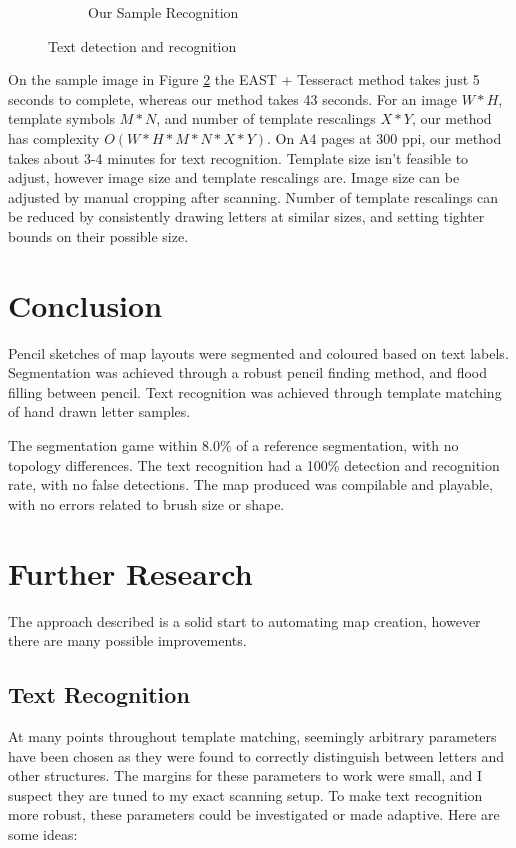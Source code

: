 \documentclass[11pt]{IEEEtran}
\begin{document}
\begin{figure}[h]
\begin{subfigure}[b]{0.4\textwidth}
         \caption{Our Sample Recognition}
         \label{fig:textrec}
     \end{subfigure}
        \caption{Text detection and recognition}
        \label{fig:texttest}
\end{figure}

On the sample image in Figure \ref{fig:texttest} the EAST + Tesseract method takes just 5 seconds to complete, whereas our method takes 43 seconds. For an image $W*H$, template symbols $M*N$, and number of template rescalings $X*Y$, our method has complexity $O(W*H*M*N*X*Y)$. On A4 pages at 300 ppi, our method takes about 3-4 minutes for text recognition. Template size isn't feasible to adjust, however image size and template rescalings are. Image size can be adjusted by manual cropping after scanning. Number of template rescalings can be reduced by consistently drawing letters at similar sizes, and setting tighter bounds on their possible size.

\section{Conclusion}

Pencil sketches of map layouts were segmented and coloured based on text labels. Segmentation was achieved through a robust pencil finding method, and flood filling between pencil. Text recognition was achieved through template matching of hand drawn letter samples. 

The segmentation game within 8.0\% of a reference segmentation, with no topology differences. The text recognition had a 100\% detection and recognition rate, with no false detections. The map produced was compilable and playable, with no errors related to brush size or shape. 

\section{Further Research}

The approach described is a solid start to automating map creation, however there are many possible improvements.

\subsection{Text Recognition}

At many points throughout template matching, seemingly arbitrary parameters have been chosen as they were found to correctly distinguish between letters and other structures. The margins for these parameters to work were small, and I suspect they are tuned to my exact scanning setup. To make text recognition more robust, these parameters could be investigated or made adaptive. Here are some ideas:
\end{document}
